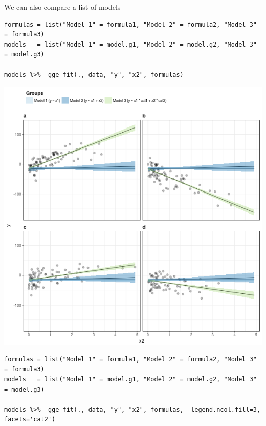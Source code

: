 \documentclass[a4paper]{article}
\begin{document}
\begin{enumerate}
We can also compare a list of models

\lstset{numbers=left,language=r,label= ,caption= ,captionpos=b}
\begin{lstlisting}
formulas = list("Model 1" = formula1, "Model 2" = formula2, "Model 3" = formula3)
models   = list("Model 1" = model.g1, "Model 2" = model.g2, "Model 3" = model.g3)

models %>%  gge_fit(., data, "y", "x2", formulas)

\end{lstlisting}

\begin{center}
\includegraphics[width=.9\linewidth]{fig-fitted-many-models-1.png}
\end{center}



\lstset{numbers=left,language=r,label= ,caption= ,captionpos=b}
\begin{lstlisting}
formulas = list("Model 1" = formula1, "Model 2" = formula2, "Model 3" = formula3)
models   = list("Model 1" = model.g1, "Model 2" = model.g2, "Model 3" = model.g3)

models %>%  gge_fit(., data, "y", "x2", formulas,  legend.ncol.fill=3, facets='cat2')

\end{lstlisting}


\end{enumerate}
\end{document}
